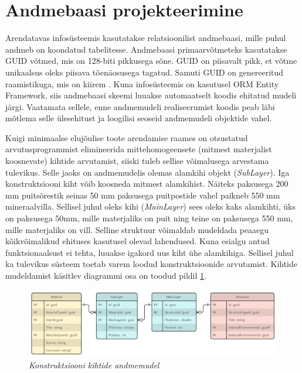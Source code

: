 \section{Andmebaasi projekteerimine}
\label{chapters:analysis_database}
Arendatavas infosüsteemis kasutatakse relatsioonilist andmebaasi, mille puhul andmeb on koondatud
tabelitesse. 
Andmebaasi primaarvõtmeteks kasutatakse GUID võtmed, mis on 128-biti pikkusega sõne.
GUID on piisavalt pikk, et võtme unikaalsus oleks piisava tõenäosusega tagatud. Samuti GUID on genereeritud
raamistikuga, mis on kiirem \cite{guid_definition}. Kuna infosüsteemis on kasutusel ORM Entity Framework, 
siis andmebaasi skeemi luuakse automaatselt koodis ehitatud mudeli järgi. Vaatamata sellele, enne 
andmemudeli realiseerumist koodis peab läbi mõtlema selle ülesehitust ja loogilisi seoseid andmemudeli
objektide vahel.

Kuigi minimaalse elujõulise toote arendamise raames on otsustatud arvutusprogrammist elimineerida mittehomogeensete
(mitmest materjalist koosnevate) kihtide arvutamist, siiski tuleb sellise võimalusega arvestama tulevikus. Selle jaoks on andmemudelis 
olemas alamkihi objekt (\textit{SubLayer}). Iga konstruktsiooni kiht võib koosneda mitmest alamkihist.
Näiteks paksusega 200 mm puitsõrestik seinas 50 mm paksusega puitpostide vahel paikneb 550 mm mineraalvilla. 
Sellisel juhul oleks kihi (\textit{MainLayer}) sees oleks kaks alamkihti, üks on paksusega 50mm, mille materjaliks
on puit ning teine on paksusega 550 mm, mille materjaliks on vill. Selline struktuur võimaldab mudeldada
peaaegu kõikvõimalikud ehituses kasutusel olevad lahendused. Kuna esialgu antud funktsionaalsust
ei tehta, luuakse igakord uus kiht ühe alamkihiga. Sellisel juhul ka tulevikus süsteem toetab varem loodud
konstruktsioonide arvutamist. Kihtide mudeldamist käsitlev diagrammi osa on toodud pildil \ref{fig:db_layers_model}.

\begin{figure}[ht]
    \centering
    \includegraphics[width=1\textwidth]{figures/analysis/db_desing_1.png}
    \caption[Konstruktsiooni kihtide andmemudel]{\textit{Konstruktsiooni kihtide andmemudel}}
    \label{fig:db_layers_model}
\end{figure}

